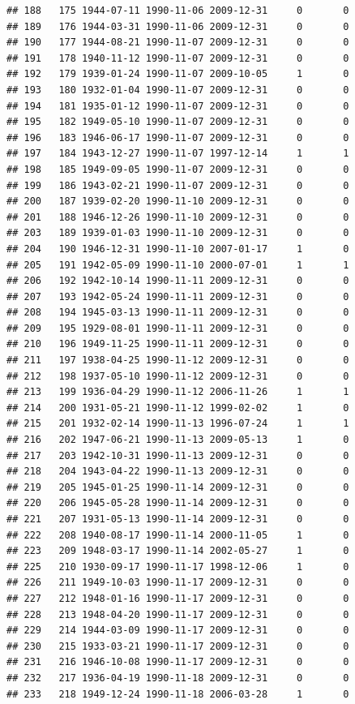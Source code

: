 \documentclass[
]{book}
\theoremstyle{definition}
\theoremstyle{definition}
\theoremstyle{definition}
\theoremstyle{definition}
\theoremstyle{remark}
\begin{document}
\begin{verbatim}
## 188   175 1944-07-11 1990-11-06 2009-12-31     0       0
## 189   176 1944-03-31 1990-11-06 2009-12-31     0       0
## 190   177 1944-08-21 1990-11-07 2009-12-31     0       0
## 191   178 1940-11-12 1990-11-07 2009-12-31     0       0
## 192   179 1939-01-24 1990-11-07 2009-10-05     1       0
## 193   180 1932-01-04 1990-11-07 2009-12-31     0       0
## 194   181 1935-01-12 1990-11-07 2009-12-31     0       0
## 195   182 1949-05-10 1990-11-07 2009-12-31     0       0
## 196   183 1946-06-17 1990-11-07 2009-12-31     0       0
## 197   184 1943-12-27 1990-11-07 1997-12-14     1       1
## 198   185 1949-09-05 1990-11-07 2009-12-31     0       0
## 199   186 1943-02-21 1990-11-07 2009-12-31     0       0
## 200   187 1939-02-20 1990-11-10 2009-12-31     0       0
## 201   188 1946-12-26 1990-11-10 2009-12-31     0       0
## 203   189 1939-01-03 1990-11-10 2009-12-31     0       0
## 204   190 1946-12-31 1990-11-10 2007-01-17     1       0
## 205   191 1942-05-09 1990-11-10 2000-07-01     1       1
## 206   192 1942-10-14 1990-11-11 2009-12-31     0       0
## 207   193 1942-05-24 1990-11-11 2009-12-31     0       0
## 208   194 1945-03-13 1990-11-11 2009-12-31     0       0
## 209   195 1929-08-01 1990-11-11 2009-12-31     0       0
## 210   196 1949-11-25 1990-11-11 2009-12-31     0       0
## 211   197 1938-04-25 1990-11-12 2009-12-31     0       0
## 212   198 1937-05-10 1990-11-12 2009-12-31     0       0
## 213   199 1936-04-29 1990-11-12 2006-11-26     1       1
## 214   200 1931-05-21 1990-11-12 1999-02-02     1       0
## 215   201 1932-02-14 1990-11-13 1996-07-24     1       1
## 216   202 1947-06-21 1990-11-13 2009-05-13     1       0
## 217   203 1942-10-31 1990-11-13 2009-12-31     0       0
## 218   204 1943-04-22 1990-11-13 2009-12-31     0       0
## 219   205 1945-01-25 1990-11-14 2009-12-31     0       0
## 220   206 1945-05-28 1990-11-14 2009-12-31     0       0
## 221   207 1931-05-13 1990-11-14 2009-12-31     0       0
## 222   208 1940-08-17 1990-11-14 2000-11-05     1       0
## 223   209 1948-03-17 1990-11-14 2002-05-27     1       0
## 225   210 1930-09-17 1990-11-17 1998-12-06     1       0
## 226   211 1949-10-03 1990-11-17 2009-12-31     0       0
## 227   212 1948-01-16 1990-11-17 2009-12-31     0       0
## 228   213 1948-04-20 1990-11-17 2009-12-31     0       0
## 229   214 1944-03-09 1990-11-17 2009-12-31     0       0
## 230   215 1933-03-21 1990-11-17 2009-12-31     0       0
## 231   216 1946-10-08 1990-11-17 2009-12-31     0       0
## 232   217 1936-04-19 1990-11-18 2009-12-31     0       0
## 233   218 1949-12-24 1990-11-18 2006-03-28     1       0

\end{verbatim}
\end{document}
